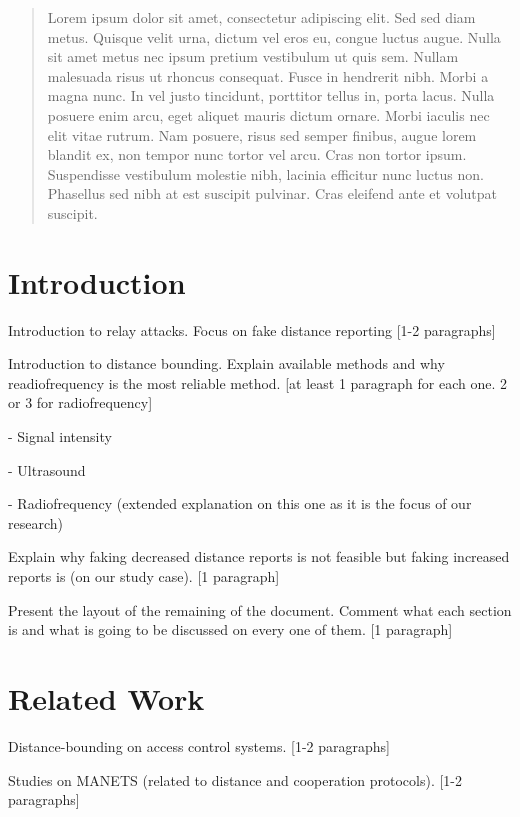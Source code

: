 \documentclass{article}
\begin{document}
\newpage


\renewcommand{\abstractname}{\Large Abstract}
\begin{abstract}
Lorem ipsum dolor sit amet, consectetur adipiscing elit. Sed sed diam metus. Quisque velit urna, dictum vel eros eu, congue luctus augue. Nulla sit amet metus nec ipsum pretium vestibulum ut quis sem. Nullam malesuada risus ut rhoncus consequat. Fusce in hendrerit nibh. Morbi a magna nunc. In vel justo tincidunt, porttitor tellus in, porta lacus. Nulla posuere enim arcu, eget aliquet mauris dictum ornare. Morbi iaculis nec elit vitae rutrum. Nam posuere, risus sed semper finibus, augue lorem blandit ex, non tempor nunc tortor vel arcu. Cras non tortor ipsum. Suspendisse vestibulum molestie nibh, lacinia efficitur nunc luctus non. Phasellus sed nibh at est suscipit pulvinar. Cras eleifend ante et volutpat suscipit.
\end{abstract}

\newpage

\section{Introduction}

Introduction to relay attacks. Focus on fake distance reporting [1-2 paragraphs]

Introduction to distance bounding. Explain available methods and why readiofrequency is the most reliable method. [at least 1 paragraph for each one. 2 or 3 for radiofrequency]

- Signal intensity

- Ultrasound

- Radiofrequency (extended explanation on this one as it is the focus of our research)

Explain why faking decreased distance reports is not feasible but faking increased reports is (on our study case). [1 paragraph]

Present the layout of the remaining of the document. Comment what each section is and what is going to be discussed on every one of them. [1 paragraph]

\section{Related Work}

Distance-bounding on access control systems. [1-2 paragraphs]

Studies on MANETS (related to distance and cooperation protocols). [1-2 paragraphs]
\end{document}
